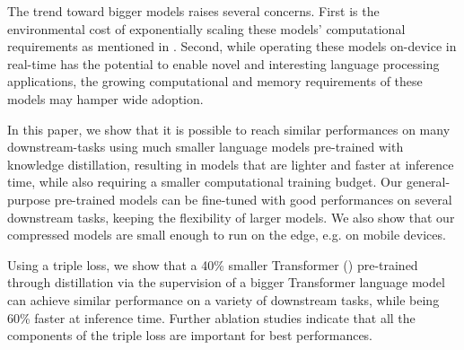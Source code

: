 \documentclass{article}
\begin{document}
The trend toward bigger models raises several concerns. First is the environmental cost of exponentially scaling these models' computational requirements as mentioned in \citet{Schwartz2019GreenA, Strubell2019EnergyAP}. Second, while operating these models on-device in real-time has the potential to enable novel and interesting language processing applications, the growing computational and memory requirements of these models may hamper wide adoption.

In this paper, we show that it is possible to reach similar performances on many downstream-tasks using much smaller language models pre-trained with knowledge distillation, resulting in models that are lighter and faster at inference time, while also requiring a smaller computational training budget. Our general-purpose pre-trained models can be fine-tuned with good performances on several downstream tasks, keeping the flexibility of larger models. We also show that our compressed models are small enough to run on the edge, e.g. on mobile devices.


\iffalse
Our work is motivated by a few observations:
\begin{itemize}
    \item As these large language models are reaching production, several important questions have emerged. How should we put the extremely large models in production? How can we use these models under low latency constraints? Do we need (costly) GPU servers to serve at scale?
    \item There is a growing interest in Machine Learning systems that operate on the edge motivated by the need for more privacy-respecting systems. Running models on devices also requires lightweight, responsive and energy-efficient models.
    \item Many researchers are more and more concerned about the environmental cost of exponentially scaling computing requirements of these models \citet{Schwartz2019GreenA}. For instance, \citet{Strubell2019EnergyAP} estimated that training BERT (\citet{Devlin2018BERTPO}) on GPU is roughly equivalent to a trans-American flight in carbon emissions.
\end{itemize}
\fi


Using a triple loss, we show that a 40\% smaller Transformer (\citet{Vaswani2017AttentionIA}) pre-trained through distillation via the supervision of a bigger Transformer language model can achieve similar performance on a variety of downstream tasks, while being 60\% faster at inference time.  Further ablation studies indicate that all the components of the triple loss are important for best performances.
\end{document}
